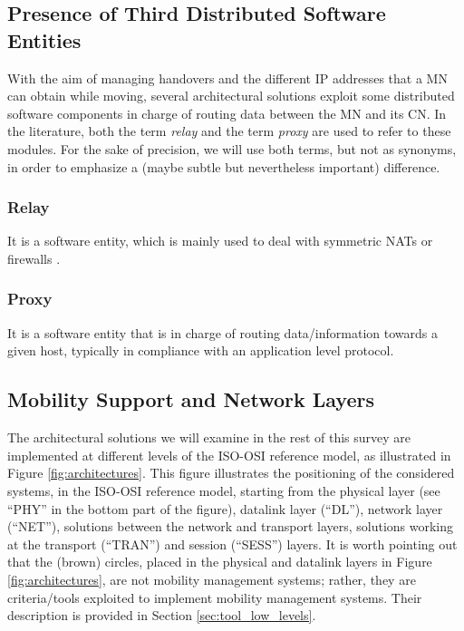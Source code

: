 \documentclass[preprint,12pt]{elsarticle}
\begin{document}
\subsection{Presence of Third Distributed Software Entities}

With the aim of managing handovers and the different IP addresses that a MN 
can obtain while moving, several architectural solutions exploit some 
distributed software components in charge of routing data
between the MN and its CN. In the literature, both the term 
\emph{relay} and the term \emph{proxy} are used to refer to these modules.
For the sake of precision, we will use both terms, but not 
as synonyms, in order to emphasize a (maybe subtle but nevertheless important) 
difference.

\subsubsection*{Relay}
It is a software entity, which is mainly used to deal with symmetric NATs or firewalls \cite{STUN,TURN,ice}.

\subsubsection*{Proxy}
It is a software entity that is in charge of routing data/information towards a 
given host, typically in compliance with an application level protocol.

\subsection{Mobility Support and Network Layers}
The architectural solutions we will examine in the rest of this survey are 
implemented at different levels of the ISO-OSI reference model, as illustrated 
in Figure \ref{fig:architectures}. This figure illustrates the positioning of the considered systems, 
in the ISO-OSI reference model, starting from the physical layer (see ``PHY'' in the bottom part of the
figure), datalink layer (``DL''), network layer 
(``NET''), solutions between the network and transport layers, solutions 
working at the transport (``TRAN'') and session (``SESS'') layers.
It is worth pointing out that the (brown) circles, placed in the physical and 
datalink layers in Figure \ref{fig:architectures}, are not mobility 
management systems; rather, they are criteria/tools exploited to implement 
mobility management systems. Their description is provided in Section 
\ref{sec:tool_low_levels}.
\end{document}
